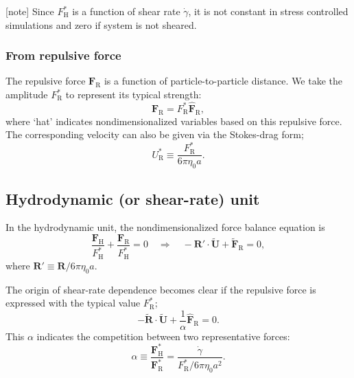 \documentclass[fontsize=11pt]{scrartcl}
\begin{document}
[note]
Since $F_{\mathrm{H}}^{\ast}$ is a function of shear rate $\dot{\gamma}$,
it is not constant in stress controlled simulations
and zero if system is not sheared.


\subsubsection*{From repulsive force}

The repulsive force $\bm{F}_{\mathrm{R}}$ 
is a function of particle-to-particle distance.
%
We take the amplitude $F_{\mathrm{R}}^{\ast}$
to represent its typical strength:
%
\begin{equation}
 \bm{F}_{\mathrm{R}} =  F_{\mathrm{R}}^{\ast}
\hat{\bm{F}}_{\mathrm{R}},
\end{equation}
where `hat' indicates nondimensionalized variables
based on this repulsive force.
%
The corresponding velocity can also be
given via the Stokes-drag form;
\begin{equation}
 U^{\ast}_{\mathrm{R}}
  \equiv \frac{F_{\mathrm{R}}^{\ast}}{6\pi\eta_0 a}.
\end{equation}
%

\subsection*{Hydrodynamic (or shear-rate) unit}

In the hydrodynamic unit, the nondimensionalized
force balance equation is
\begin{equation}
 \frac{\bm{F}_{\mathrm{H}}}{F^{\ast}_{\mathrm{H}}}
  +
  \frac{\bm{F}_{\mathrm{R}}}{F^{\ast}_{\mathrm{H}}}  = 0
  \quad
  \Longrightarrow 
    \quad
 - \bm{R}' \cdot \tilde{\bm{U}} + \tilde{\bm{F}}_{\mathrm{R}} = 0,
\end{equation}
where
$\bm{R}' \equiv \bm{R} / 6 \pi \eta_0 a $.

The origin of shear-rate dependence
becomes clear if the repulsive force
is expressed with the typical value $F_{\mathrm{R}}^{\ast}$;
%
\begin{equation}
 - \tilde{\bm{R}} \cdot \tilde{\bm{U}} +
\frac{1}{\alpha}  \hat{\bm{F}}_{\mathrm{R}} = 0.
\end{equation}
%
This $\alpha$ indicates the competition between two representative forces:
\begin{equation}
 \alpha \equiv
\frac{\bm{F}_{\mathrm{H}}^{\ast}}{\bm{F}_{\mathrm{R}}^{\ast}}
=
  \frac{\dot{\gamma}}{F_{\mathrm{R}}^{\ast}/6\pi\eta_0 a^2}\label{102734_31May15}.
\end{equation}
\end{document}
